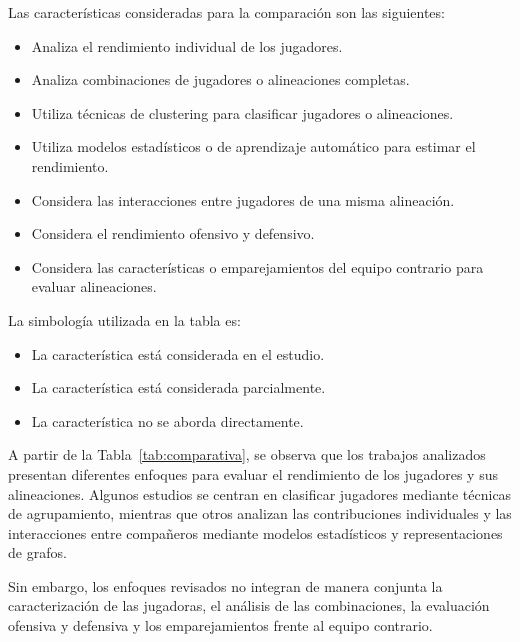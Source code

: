Las características consideradas para la
comparación son las siguientes:

\begin{itemize}
    \item[C1.] Analiza el rendimiento individual
    de los jugadores.

    \item[C2.] Analiza combinaciones de jugadores
    o alineaciones completas.

    \item[C3.] Utiliza técnicas de clustering
    para clasificar jugadores o alineaciones.

    \item[C4.] Utiliza modelos estadísticos o de
    aprendizaje automático para estimar el
    rendimiento.

    \item[C5.] Considera las interacciones entre
    jugadores de una misma alineación.

    \item[C6.] Considera el rendimiento ofensivo
    y defensivo.

    \item[C7.] Considera las características
    o emparejamientos del equipo contrario
    para evaluar alineaciones.
\end{itemize}

La simbología utilizada en la tabla es:

\begin{itemize}
    \item[$\checkmark$] La característica
    está considerada en el estudio.

    \item[$\triangle$] La característica
    está considerada parcialmente.

    \item[--] La característica no se
    aborda directamente.
\end{itemize}

A partir de la Tabla~\ref{tab:comparativa},
se observa que los trabajos analizados presentan
diferentes enfoques para evaluar el rendimiento
de los jugadores y sus alineaciones. Algunos
estudios se centran en clasificar jugadores
mediante técnicas de agrupamiento, mientras
que otros analizan las contribuciones individuales
y las interacciones entre compañeros mediante
modelos estadísticos y representaciones de grafos.

Sin embargo, los enfoques revisados no integran
de manera conjunta la caracterización de las
jugadoras, el análisis de las combinaciones,
la evaluación ofensiva y defensiva y los
emparejamientos frente al equipo contrario.
